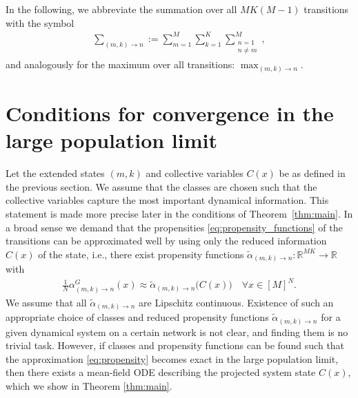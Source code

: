 \documentclass[a4paper,
               10pt,
               pdftex,
               normalheadings,
               headsepline,
               footsepline,
               headinclude,
               footinclude,
               DIV=14,
               abstracton]
{scrartcl}
\newcommand{\R}{\mathbb{R}}
\begin{document}
In the following, we abbreviate the summation over all $MK (M-1)$ transitions with the symbol
\begin{align}
    \sum_{(m,k)\to n} := \sum_{m=1}^M \sum_{k=1}^K \sum_{\substack{n=1 \\ n\neq m}}^M,
\end{align}
and analogously for the maximum over all transitions: $\max_{(m,k)\to n}$.


\section{Conditions for convergence in the large population limit} \label{sec:main_theorem}

Let the extended states $(m, k)$ and collective variables $C(x)$ be as defined in the previous section.
We assume that the classes are chosen such that the collective variables capture the most important dynamical information. This statement is made more precise later in the conditions of Theorem~\ref{thm:main}. In a broad sense we demand that the propensities \eqref{eq:propensity_functions} of the transitions can be approximated well by using only the reduced information $C(x)$ of the state, i.e.,
there exist propensity functions $\tilde{\alpha}_{(m,k)\to n}: \mathbb{R}^{MK} \to \R$ with
\begin{align}
    \frac{1}{N} \alpha_{(m,k)\to n}^{G}(x)  \approx \tilde{\alpha}_{(m,k)\to n}\big( C(x) \big) \quad \forall x\in [M]^N.
    \label{eq:propensity}
\end{align}
We assume that all $\tilde{\alpha}_{(m,k)\to n}$ are Lipschitz continuous.
Existence of such an appropriate choice of classes and reduced propensity functions $\tilde{\alpha}_{(m,k)\to n}$ for a given dynamical system on a certain network is not clear, and finding them is no trivial task.
However, if classes and propensity functions can be found such that the approximation \eqref{eq:propensity} becomes exact in the large population limit, then there exists a mean-field ODE describing the projected system state $C(x)$, which we show in Theorem \ref{thm:main}.
\end{document}
